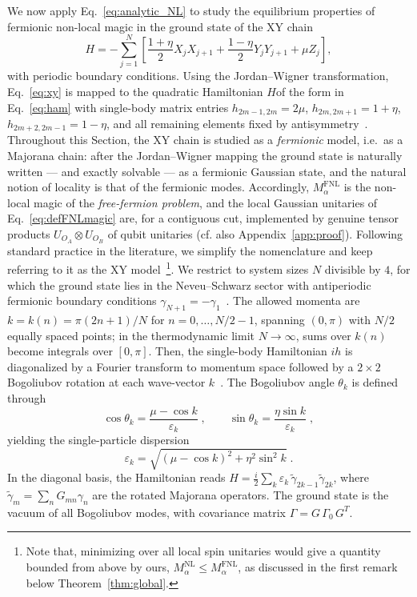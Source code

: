 \documentclass[prx,twocolumn,superscriptaddress,aps,10pt, frontmatterverbose, reprint,footinbib,longbibliography=true]{revtex4-2}
\newcommand{\RENYI}{\alpha}
\begin{document}
We now apply Eq.~\eqref{eq:analytic_NL} to study the equilibrium properties of fermionic non-local magic in the ground state of the XY chain
\begin{equation}
    H = -\sum_{j=1}^{N}\!\left[\frac{1+\eta}{2}X_j X_{j+1} + \frac{1-\eta}{2}Y_j Y_{j+1} + \mu Z_j\right],
    \label{eq:xy}
\end{equation}
with periodic boundary conditions.
Using the Jordan--Wigner transformation, Eq.~\eqref{eq:xy} is mapped to the quadratic Hamiltonian $H$of the form in Eq.~\eqref{eq:ham} with single-body matrix entries $h_{2m-1,2m} = 2\mu$, $h_{2m,2m+1} = 1+\eta$, $h_{2m+2,2m-1} = 1-\eta$, and all remaining elements fixed by antisymmetry~\cite{Mbeng2024}. 
Throughout this Section, the XY chain is studied as a \emph{fermionic} model, i.e.\ as a Majorana chain: after the Jordan--Wigner mapping the ground state is naturally written --- and exactly solvable --- as a fermionic Gaussian state, and the natural notion of locality is that of the fermionic modes. 
Accordingly, $M_\RENYI^{\mathrm{FNL}}$ is the non-local magic of the \textit{free-fermion problem}, and the local Gaussian unitaries of Eq.~\eqref{eq:defFNLmagic} are, for a contiguous cut, implemented by genuine tensor products $U_{O_A}\otimes U_{O_B}$ of qubit unitaries (cf. also Appendix~\ref{app:proof}).
Following standard practice in the literature, we simplify the nomenclature and keep referring to it as the XY model~\footnote{Note that, minimizing over all local spin unitaries would give a quantity bounded from above by ours, $M_\RENYI^{\mathrm{NL}}\le M_\RENYI^{\mathrm{FNL}}$, as discussed in the first remark below Theorem~\ref{thm:global}.}. 
We restrict to system sizes $N$ divisible by $4$, for which the ground state lies in the Neveu--Schwarz sector with antiperiodic fermionic boundary
conditions $\gamma_{N+1}=-\gamma_1$~\cite{Mbeng2024}.
The allowed momenta are 
$k=k(n)= \pi(2n+1)/N$ for $n = 0,\dots, N/2-1$, 
spanning $(0,\pi)$ with $N/2$ equally spaced points; 
in the thermodynamic limit $N\to\infty$, sums over $k(n)$ 
become integrals over $[0,\pi]$.
Then, the single-body Hamiltonian $ih$ is diagonalized by a Fourier transform to momentum space followed by a $2\times 2$ Bogoliubov rotation at each wave-vector $k$~\cite{Mbeng2024}.
The Bogoliubov angle $\theta_k$ is defined through
\begin{equation}
    \cos\theta_k = \frac{\mu - \cos k}{\varepsilon_k}\;,\qquad \sin\theta_k = \frac{\eta\sin k}{\varepsilon_k}\;,
    \label{eq:bogoliubov_angle}
\end{equation}
yielding the single-particle dispersion
\begin{equation}
    \varepsilon_k = \sqrt{(\mu-\cos k)^2 + \eta^2\sin^2 k}\;.
    \label{eq:dispersion}
\end{equation}
In the diagonal basis, the Hamiltonian reads $H = \frac{i}{2}\sum_k \varepsilon_k\,\tilde\gamma_{2k-1}\tilde\gamma_{2k}$, where $\tilde\gamma_m = \sum_n G_{mn}\gamma_n$ are the rotated Majorana operators.
The ground state is the vacuum of all Bogoliubov modes, with covariance matrix $\Gamma = G\,\Gamma_0\, G^T$.
\end{document}
